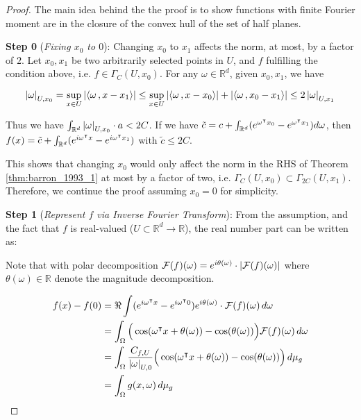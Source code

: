 \begin{proof}

    The main idea behind the the proof is to show functions with finite Fourier
    moment are in the closure of the convex hull of the set of half planes.

    \textbf{Step 0} (\textit{Fixing $x_0$ to $0$}): Changing $x_0$ to $x_1$
    affects the norm, at most, by a factor of $2$. Let $x_0, x_1$ be two
    arbitrarily selected points in $U$, and $f$ fulfilling the condition above,
    i.e. $f \in \Gamma_C(U, x_0)$. For any $\omega \in \mathbb{R}^d$, given
    $x_0, x_1$, we have

    \begin{equation}
        \left| \omega \right|_{U, x_0} 
            = \sup_{x\in U}\left| \left\langle \omega\, , x-x_1 \right\rangle \right| 
            \leq \sup_{x\in U}\left| \left\langle \omega\, , x-x_0 \right\rangle \right| + \left| \left\langle \omega\, , x_0-x_1 \right\rangle \right| 
            \leq 2\left| \omega \right|_{U, x_1}
    \end{equation}

    Thus we have $\int_{\mathbb{R}^d} \left| \omega \right|_{U, x_0} \cdot a < 2C$. If we
    have $\tilde{c} = c + \int_{\mathbb{R}^d} (e^{\omega{}^{\intercal} x_0} - e^{\omega{}^{\intercal}
    x_1}) d\omega$, then $f(x) = \tilde{c} + \int_{\mathbb{R}^d} (e^{i\omega{}^{\intercal}
    x} - e^{i\omega{}^{\intercal} x_1})$ with $\tilde{c} \leq 2C$.

    This shows that changing $x_0$ would only affect the norm in the RHS of
    Theorem \ref{thm:barron_1993_1} at most by a factor of two, i.e.
    $\Gamma_C(U, x_0) \subset \Gamma_{2C}(U, x_1)$. Therefore, we continue the
    proof assuming $x_0 = 0$ for simplicity.

    \textbf{Step 1} (\textit{Represent $f$ via Inverse Fourier Transform}): From
    the assumption, and the fact that $f$ is real-valued ($U \subset
    \mathbb{R}^d \to \mathbb{R}$), the real number part can be written as:

    Note that with polar decomposition $\mathcal{F}(f)(\omega) =
    e^{i\theta(\omega)} \cdot \left| \mathcal{F}(f)(\omega) \right|$ where $\theta(\omega)
    \in \mathbb{R}$ denote the magnitude decomposition.

    \begin{align}
        f(x) - f(0)
         & = \Re \int (e^{i\omega{}^{\intercal} x} - e^{i\omega{}^{\intercal} 0}) e^{i\theta(\omega)} \cdot 
         \mathcal{F}(f)(\omega)\,d\omega \\
         & = \int_{\Omega}\Big(\cos(\omega{}^{\intercal} x + \theta(\omega)) - \cos(\theta(\omega))\Big)
         \mathcal{F}(f)(\omega)\,d\omega \\
         & = \int_{\Omega} \frac{C_{f,U}}{\left| \omega \right|_{U, 0}}\Big(\cos(\omega{}^{\intercal} x + \theta
         (\omega)) - \cos(\theta(\omega))\Big)\,d\mu_g \\
         & = \int_{\Omega} g(x, \omega)\,d\mu_g \label{eq:barron_fouier_int}
    \end{align}


\end{proof}

